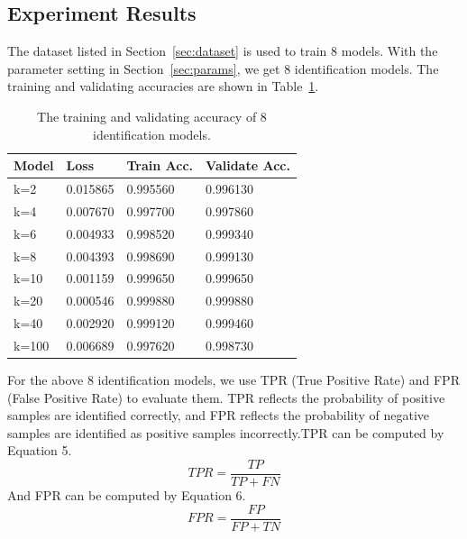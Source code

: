 \documentclass[conference]{IEEEtran}
\begin{document}
\subsection{Experiment Results}
\label{sec:experimentresults}
The dataset listed in Section~\ref{sec:dataset} is used to train 8 models. With the parameter setting in Section~\ref{sec:params}, we get 8 identification models. The training and validating accuracies are shown in Table~\ref{tab:acc4models}.
\begin{table}
  \caption{The training and validating accuracy of 8 identification models.}
  \label{tab:acc4models}
  \centering
  \begin{tabular}{p{2cm}p{2cm}p{2cm}p{2.3cm}}
    \hline
    Model & Loss &Train Acc. &Validate Acc.\\
    \hline
    k=2      & 0.015865  & 0.995560  &0.996130  \\
    k=4      & 0.007670  & 0.997700  &0.997860 \\
    k=6      & 0.004933  & 0.998520  &0.999340 \\
    k=8      & 0.004393  & 0.998690  &0.999130 \\
    k=10     & 0.001159  & 0.999650  &0.999650  \\
    k=20     & 0.000546  & 0.999880  &0.999880 \\
    k=40     & 0.002920  & 0.999120  &0.999460  \\
    k=100    & 0.006689  & 0.997620  &0.998730  \\
    \hline
  \end{tabular}
\end{table}

For the above 8 identification models, we use TPR (True Positive Rate) and FPR (False Positive Rate) to evaluate them. TPR reflects the probability of positive samples are identified correctly, and FPR reflects the probability of negative samples are identified as positive samples incorrectly.TPR can be computed by Equation 5.
\begin{equation}
TPR = \frac{{TP}}{{TP + FN}}
\end{equation}
And FPR can be computed by Equation 6.
\begin{equation}
FPR = \frac{{FP}}{{FP + TN}}
\end{equation}
\end{document}
